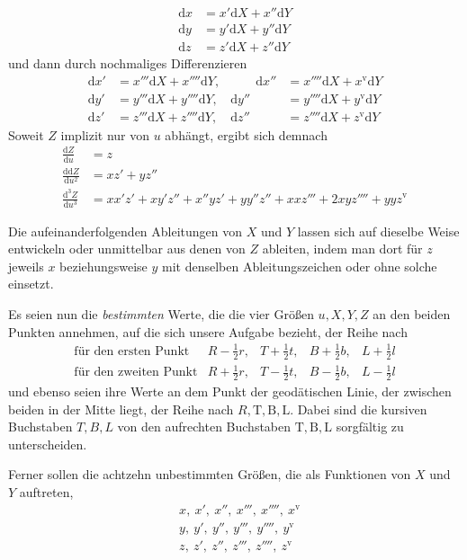 %
\[
\begin{aligned}
\mathrm{d}x&=x'\mathrm{d}X+x''\mathrm{d}Y\\
\mathrm{d}y&=y'\mathrm{d}X+y''\mathrm{d}Y\\
\mathrm{d}z&=z'\mathrm{d}X+z''\mathrm{d}Y
\end{aligned}
\]
und dann durch nochmaliges Differenzieren
\[
\begin{aligned}
\mathrm{d}x'&=x'''\mathrm{d}X+x''''\mathrm{d}Y,&\qquad \mathrm{d}x''&=x''''\mathrm{d}X+x^{\mathrm{v}}\mathrm{d}Y\\
\mathrm{d}y'&=y'''\mathrm{d}X+y''''\mathrm{d}Y,&\mathrm{d}y''&=y''''\mathrm{d}X+y^{\mathrm{v}}\mathrm{d}Y\\
\mathrm{d}z'&=z'''\mathrm{d}X+z''''\mathrm{d}Y,&\mathrm{d}z''&=z''''\mathrm{d}X+z^{\mathrm{v}}\mathrm{d}Y
\end{aligned}
\]
Soweit \(Z\) implizit nur von \(u\) abhängt, ergibt sich demnach
\[
\begin{aligned}
\frac{\mathrm{d}Z}{\mathrm{d}u}&=z\\
\frac{\mathrm{dd}Z}{\mathrm{d}u^2}&=xz'+yz''\\
\frac{\mathrm{d}^3Z}{\mathrm{d}u^3}&=xx'z'+xy'z''+x''yz'+yy''z''+xxz'''+2xyz''''+yyz^{\mathrm{v}}
\end{aligned}
\]

\indent Die aufeinanderfolgenden Ableitungen von \(X\) und \(Y\) lassen sich auf dieselbe Weise entwickeln oder unmittelbar aus denen von \(Z\) ableiten, indem man dort für \(z\) jeweils \(x\) beziehungsweise \(y\) mit denselben Ableitungszeichen oder ohne solche einsetzt.

Es seien nun die \textit{bestimmten} Werte, die die vier Größen \(u,X,Y,Z\) an den beiden Punkten annehmen, auf die sich unsere Aufgabe bezieht, der Reihe nach
\[
\begin{array}{lllll}
\text{für den ersten Punkt}&R-\tfrac12r,&T+\tfrac12t,&B+\tfrac12b,&L+\tfrac12l\\
\text{für den zweiten Punkt}&R+\tfrac12r,&T-\tfrac12t,&B-\tfrac12b,&L-\tfrac12l
\end{array}
\]
und ebenso seien ihre Werte an dem Punkt der geodätischen Linie, der zwischen beiden in der Mitte liegt, der Reihe nach \(R,\mathrm{T},\mathrm{B},\mathrm{L}\). Dabei sind die kursiven Buchstaben \(T,B,L\) von den aufrechten Buchstaben \(\mathrm{T},\mathrm{B},\mathrm{L}\) sorgfältig zu unterscheiden.

Ferner sollen die achtzehn unbestimmten Größen, die als Funktionen von \(X\) und \(Y\) auftreten,
\[
\begin{aligned}
&x,\ x',\ x'',\ x''',\ x'''',\ x^{\mathrm{v}}\\
&y,\ y',\ y'',\ y''',\ y'''',\ y^{\mathrm{v}}\\
&z,\ z',\ z'',\ z''',\ z'''',\ z^{\mathrm{v}}
\end{aligned}
\]
